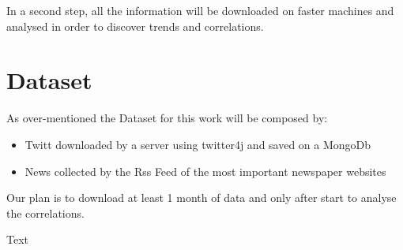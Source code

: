\documentclass[a4paper]{article}
\begin{document}
In a second step, all the information will be downloaded on faster machines and analysed in order to discover trends and correlations.

\section{Dataset}

As over-mentioned the Dataset for this work will be composed by:

\begin{itemize}
	\item Twitt downloaded by a server using twitter4j and saved on a MongoDb
	\item News collected by the Rss Feed of the most important newspaper websites
\end{itemize}

Our plan is to download at least 1 month of data and only after start to analyse the correlations.

\begin{thebibliography}{9}
\bibitem{}
Text
\end{thebibliography}
\end{document}
